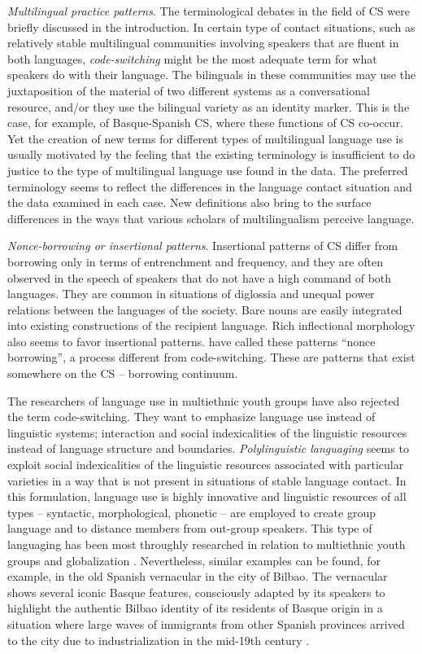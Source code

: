\documentclass[output=paper,
modfonts
]{langscibook}
\begin{document}
\textit{Multilingual practice patterns}. The terminological debates in the field of CS were briefly discussed in the introduction. In certain type of contact situations, such as relatively stable multilingual communities involving speakers that are fluent in both languages,\textit{ code-switching }might be the most adequate term for what speakers do with their language. The bilinguals in these communities may use the juxtaposition of the material of two different systems as a conversational resource, and/or they use the bilingual variety as an identity marker. This is the case, for example, of Basque-Spanish CS, where these functions of CS co-occur. Yet the creation of new terms for different types of multilingual language use is usually motivated by the feeling that the existing terminology is insufficient to do justice to the type of multilingual language use found in the data. The preferred terminology seems to reflect the differences in the language contact situation and the data examined in each case. New definitions also bring to the surface differences in the ways that various scholars of multilingualism perceive language.

\textit{Nonce-borrowing or insertional patterns}. Insertional patterns of CS differ from borrowing only in terms of entrenchment and frequency, and they are often observed in the speech of speakers that do not have a high command of both languages. They are common in situations of diglossia and unequal power relations between the languages of the society. Bare nouns are easily integrated into existing constructions of the recipient language. Rich inflectional morphology also seems to favor insertional patterns. \cite{poplack1998introduction} have called these patterns “nonce borrowing”, a process different from code-switching. These are patterns that exist somewhere on the CS – borrowing continuum.

The researchers of language use in multiethnic youth groups have also rejected the term code-switching. They want to emphasize language use instead of linguistic systems; interaction and social indexicalities of the linguistic resources instead of language structure and boundaries. \textit{Polylinguistic languaging} \parencite{jorgensen2011polylanguaging} seems to exploit social indexicalities of the linguistic resources associated with particular varieties in a way that is not present in situations of stable language contact. In this formulation, language use is highly innovative and linguistic resources of all types – syntactic, morphological, phonetic – are employed to create group language and to distance members from out-group speakers. This type of languaging has been most throughly researched in relation to multiethnic youth groups and globalization \parencite{schoonen2005street,lehtonen2015tyylitellen}. Nevertheless, similar examples can be found, for example, in the old Spanish vernacular in the city of Bilbao. The vernacular shows several iconic Basque features, consciously adapted by its speakers to highlight the authentic Bilbao identity of its residents of Basque origin in a situation where large waves of immigrants from other Spanish provinces arrived to the city due to industrialization in the mid-19th century \parencite{lantto20165}.   
\end{document}
